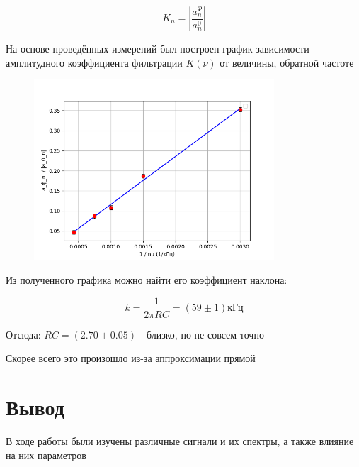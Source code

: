 \documentclass[a4paper]{article}
\begin{document}
\begin{equation}
    K_n = | \frac{a_n^\Phi}{a_n^0} |
\end{equation}

На основе проведённых измерений был построен график зависимости амплитудного коэффициента фильтрации $K(\nu)$
от величины, обратной частоте

\begin{figure}[h!]
\centering
\includegraphics[width=0.8\textwidth]{graph.png}
\caption{}
\end{figure}

Из полученного графика можно найти его коэффициент наклона:

\begin{equation}
    k = \frac{1}{2\pi RC} = (59 \pm 1) \text{кГц}
\end{equation}

Отсюда: $RC = (2.70 \pm 0.05)$ - близко, но не совсем точно

Скорее всего это произошло из-за аппроксимации прямой

\newpage
\cleanpage

\section{Вывод}

В ходе работы были изучены различные сигнали и их спектры, а также влияние на них параметров
\end{document}

